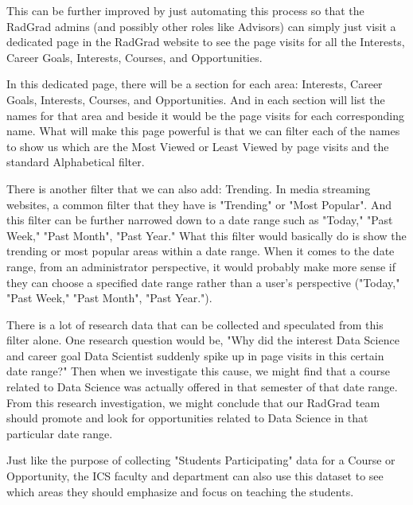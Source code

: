 \documentclass[english]{proposalnsf}
\begin{document}
    This can be further improved by just automating this process so that the RadGrad admins (and possibly other roles like Advisors) can simply just visit a dedicated page in the RadGrad website to see the page visits for all the Interests, Career Goals, Interests, Courses, and Opportunities.

    In this dedicated page, there will be a section for each area: Interests, Career Goals, Interests, Courses, and Opportunities.
    And in each section will list the names for that area and beside it would be the page visits for each corresponding name.
    What will make this page powerful is that we can filter each of the names to show us which are the Most Viewed or Least Viewed by page visits and the standard Alphabetical filter.

    There is another filter that we can also add: Trending.
    In media streaming websites, a common filter that they have is "Trending" or "Most Popular".
    And this filter can be further narrowed down to a date range such as "Today," "Past Week," "Past Month", "Past Year." What this filter would basically do is show the trending or most popular areas within a date range.
    When it comes to the date range, from an administrator perspective, it would probably make more sense if they can choose a specified date range rather than a user's perspective ("Today," "Past Week," "Past Month", "Past Year.").

    There is a lot of research data that can be collected and speculated from this filter alone.
    One research question would be, "Why did the interest Data Science and career goal Data Scientist suddenly spike up in page visits in this certain date range?" Then when we investigate this cause, we might find that a course related to Data Science was actually offered in that semester of that date range.
    From this research investigation, we might conclude that our RadGrad team should promote and look for opportunities related to Data Science in that particular date range.

    Just like the purpose of collecting "Students Participating" data for a Course or Opportunity, the ICS faculty and department can also use this dataset to see which areas they should emphasize and focus on teaching the students.
\end{document}
